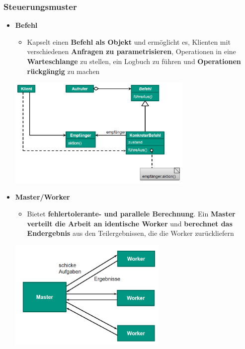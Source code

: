 \subsubsection{Steuerungsmuster}
			
\begin{itemize}
\item \textbf{Befehl}
\begin{itemize}
\item Kapselt einen \textbf{Befehl als Objekt} und ermöglicht es, Klienten mit verschiedenen \textbf{Anfragen zu parametrisieren}, Operationen in eine \textbf{Warteschlange} zu stellen, ein Logbuch zu führen und \textbf{Operationen rückgängig} zu machen
\end{itemize}
\begin{center}
\includegraphics[width=0.7\textwidth]{../images/befehl.png}
\end{center}
\item \textbf{Master/Worker}
\begin{itemize}
\item Bietet \textbf{fehlertolerante- und parallele Berechnung}. Ein \textbf{Master verteilt die Arbeit an identische Worker} und \textbf{berechnet das Endergebnis} aus den Teilergebnissen, die die Worker zurückliefern
\end{itemize}
\begin{center}
\includegraphics[width=0.6\textwidth]{../images/masterWorker.png}
\end{center}
\end{itemize}
	
